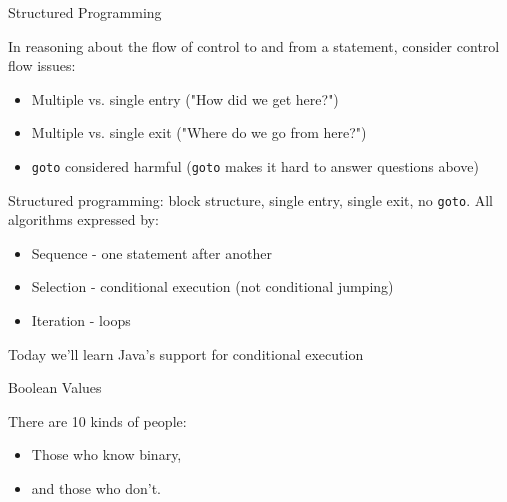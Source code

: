 \documentclass{beamer}
\begin{document}
\begin{frame}
  \titlepage
\end{frame}

\begin{frame}[fragile]{Structured Programming}


In reasoning about the flow of control to and from a statement, consider control flow issues:
\begin{itemize}
\item Multiple vs. single entry ("How did we get here?")
\item Multiple vs. single exit ("Where do we go from here?")
\item {\tt goto} considered harmful ({\tt goto} makes it hard to answer questions above)
\end{itemize}

Structured programming: block structure, single entry, single exit, no {\tt goto}.  All algorithms expressed by:
\begin{itemize}
\item Sequence - one statement after another
\item Selection - conditional execution (not conditional jumping)
\item Iteration - loops
\end{itemize}

Today we'll learn Java's support for conditional execution

\end{frame}


\begin{frame}[fragile]{Boolean Values}


There are 10 kinds of people:
\pause
\begin{itemize}
\item Those who know binary,
\pause
\item and those who don't.
\end{itemize}


\end{frame}
\end{document}
